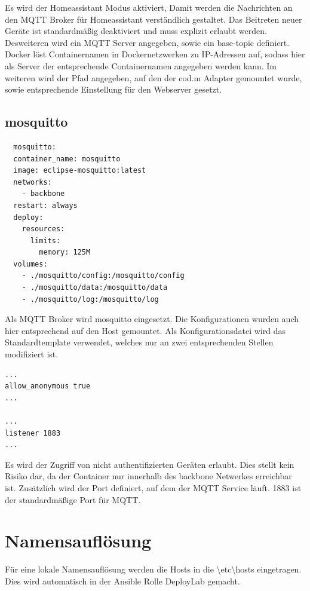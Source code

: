 Es wird der \grqq Homeassistant\grqq{} Modus aktiviert, Damit werden die Nachrichten an den MQTT Broker für Homeassistant verständlich gestaltet.
Das Beitreten neuer Geräte ist standardmäßig deaktiviert und muss explizit erlaubt werden. Desweiteren wird ein MQTT Server angegeben, sowie ein \grqq base-topic\grqq{}
definiert. Docker löst Containernamen in Dockernetzwerken zu IP-Adressen auf, sodass hier als Server der entsprechende Containernamen angegeben werden
kann. Im weiteren wird der Pfad angegeben, auf den der cod.m Adapter gemountet wurde, sowie entsprechende Einstellung für den Webserver gesetzt.

\subsection{mosquitto}

\begin{lstlisting}
  mosquitto:
  container_name: mosquitto
  image: eclipse-mosquitto:latest
  networks:
    - backbone
  restart: always
  deploy:
    resources:
      limits:
        memory: 125M
  volumes:
    - ./mosquitto/config:/mosquitto/config
    - ./mosquitto/data:/mosquitto/data
    - ./mosquitto/log:/mosquitto/log
\end{lstlisting}

Als MQTT Broker wird \grqq mosquitto\grqq{} eingesetzt. Die Konfigurationen 
wurden auch hier entsprechend auf den Host gemountet. Als Konfigurationsdatei wird das Standardtemplate verwendet, welches nur an zwei 
entsprechenden Stellen modifiziert ist.

\begin{lstlisting}
... 
allow_anonymous true
... 

... 
listener 1883
... 
\end{lstlisting}

Es wird der Zugriff von nicht authentifizierten Geräten erlaubt. Dies stellt kein Risiko dar, da der Container nur innerhalb des \grqq backbone\grqq{} 
Netwerkes erreichbar ist. Zusätzlich wird der Port definiert, auf dem der MQTT Service läuft. 1883 ist der standardmäßige Port für MQTT.

\section{Namensauflösung}

Für eine lokale Namensauflösung werden die Hosts in die \grqq \textbackslash etc\textbackslash hosts\grqq{} eingetragen. Dies wird automatisch in der Ansible
Rolle \grqq DeployLab\grqq{} gemacht.

